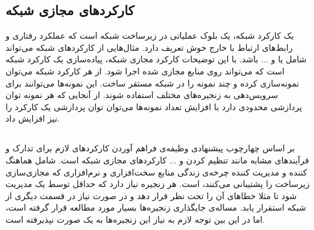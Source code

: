 \subsection{کارکردهای مجازی شبکه}
یک کارکرد شبکه، یک بلوک عملیاتی در زیرساخت شبکه است که عملکرد رفتاری و رابط‌های ارتباط با خارج خوش تعریف دارد.
مثال‌هایی از کارکردهای شبکه می‌تواند شامل
یا
و ... باشد.
با این توضیحات کارکرد مجازی شبکه، پیاده‌سازی یک کارکرد شبکه است
که می‌تواند روی منابع مجازی شده اجرا شود.
از هر کارکرد شبکه می‌توان نمونه‌سازی کرده و چند نمونه را در شبکه مستقر ساخت. 
این نمونه‌ها می‌توانند برای سرویس‌دهی به زنجیره‌های مختلف استفاده شوند. از آنجایی که 
هر نمونه توان پردازشی محدودی دارد با افزایش تعداد نمونه‌ها می‌توان توان پردازشی یک کارکرد را نیز افزایش داد.

\subsection{}
بر اساس چهارچوب پیشنهادی 
وظیفه‌ی  فراهم آوردن کارکردهای لازم
برای تدارک و فرآیند‌های مشابه مانند تنظیم کردن و ... کارکردهای مجازی شبکه است.
 شامل هماهنگ کننده و مدیریت کننده چرخه‌ی زندگی
منابع سخت‌افزاری و نرم‌افزاری که مجازی‌سازی زیرساخت را پشتیبانی می‌کنند، است.
هر زنجیره نیاز دارد که حداقل توسط یک  مدیریت شود
تا مثلا خطاهای آن را تحت نظر قرار دهد و در صورت نیاز در قسمت دیگری از شبکه استقرار یابد.
مساله‌ی جایگذاری زنجیره‌ها بسیار مورد مطالعه قرار گرفته است، اما در این بین توجه لازم به نیاز این زنجیره‌ها به یک
صورت نپذیرفته است.